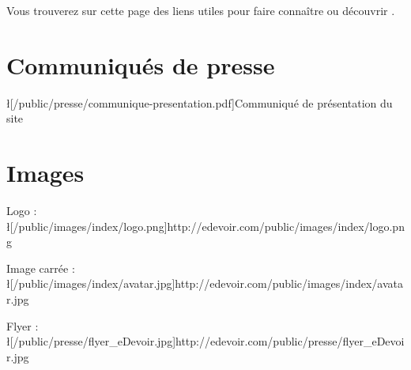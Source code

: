 Vous trouverez sur cette page des liens utiles pour faire connaître ou découvrir \eDevoir.

\section{Communiqués de presse}
\item \l[/public/presse/communique-presentation.pdf]{Communiqué de présentation du site}

\section{Images}
\item Logo : \l[/public/images/index/logo.png]{http://edevoir.com/public/images/index/logo.png}
\item Image carrée : \l[/public/images/index/avatar.jpg]{http://edevoir.com/public/images/index/avatar.jpg}
\item Flyer : \l[/public/presse/flyer_eDevoir.jpg]{http://edevoir.com/public/presse/flyer_eDevoir.jpg}